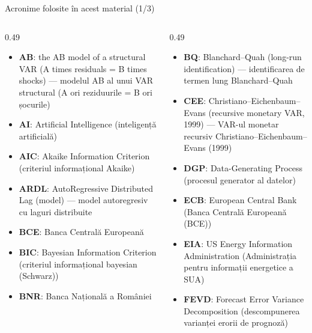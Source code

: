 \begin{frame}{Acronime folosite în acest material (1/3)}
\begin{columns}[T]
\begin{column}{0.49\textwidth}
\begin{itemize}\setlength{\itemsep}{0pt}
    \item \textbf{AB}: the AB model of a structural VAR (A times residuals = B times shocks) — modelul AB al unui VAR structural (A ori reziduurile = B ori șocurile)
    \item \textbf{AI}: Artificial Intelligence (inteligență artificială)
    \item \textbf{AIC}: Akaike Information Criterion (criteriul informațional Akaike)
    \item \textbf{ARDL}: AutoRegressive Distributed Lag (model) — model autoregresiv cu laguri distribuite
    \item \textbf{BCE}: Banca Centrală Europeană
    \item \textbf{BIC}: Bayesian Information Criterion (criteriul informațional bayesian (Schwarz))
    \item \textbf{BNR}: Banca Națională a României
\end{itemize}
\end{column}
\begin{column}{0.49\textwidth}
\begin{itemize}\setlength{\itemsep}{0pt}
    \item \textbf{BQ}: Blanchard–Quah (long-run identification) — identificarea de termen lung Blanchard–Quah
    \item \textbf{CEE}: Christiano–Eichenbaum–Evans (recursive monetary VAR, 1999) — VAR-ul monetar recursiv Christiano–Eichenbaum–Evans (1999)
    \item \textbf{DGP}: Data-Generating Process (procesul generator al datelor)
    \item \textbf{ECB}: European Central Bank (Banca Centrală Europeană (BCE))
    \item \textbf{EIA}: US Energy Information Administration (Administrația pentru informații energetice a SUA)
    \item \textbf{FEVD}: Forecast Error Variance Decomposition (descompunerea varianței erorii de prognoză)
\end{itemize}
\end{column}
\end{columns}
\end{frame}
